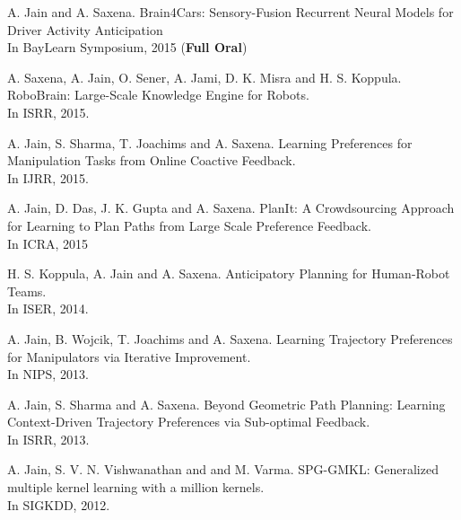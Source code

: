 \documentclass[line,margin]{res}
\begin{document}
\begin{resume}
		A. Jain and A. Saxena. Brain4Cars: Sensory-Fusion Recurrent Neural Models for Driver Activity Anticipation\\
In BayLearn Symposium, 2015 (\textbf{Full Oral}) 
 
  		A. Saxena, A. Jain, O. Sener, A. Jami, D. K. Misra and H. S. Koppula.
RoboBrain: Large-Scale Knowledge Engine for Robots.\\In ISRR, 2015.

  		A. Jain, S. Sharma, T. Joachims and  A. Saxena. Learning Preferences for
Manipulation Tasks from Online Coactive Feedback.\\In IJRR, 2015.
 
 		A. Jain, D. Das, J. K. Gupta and  A. Saxena. PlanIt: A Crowdsourcing
Approach for Learning to Plan Paths from Large Scale Preference Feedback.\\In ICRA, 2015
 
 		H. S. Koppula, A. Jain and A. Saxena. Anticipatory Planning for
Human-Robot Teams.\\In ISER, 2014.
 
		 A. Jain, B. Wojcik, T. Joachims and A. Saxena. Learning Trajectory Preferences for Manipulators via Iterative Improvement.\\In NIPS, 2013.

 		A. Jain, S. Sharma  and A. Saxena. Beyond Geometric Path Planning:
Learning Context-Driven Trajectory Preferences via Sub-optimal Feedback.\\In ISRR, 2013.

  		A. Jain, S. V. N. Vishwanathan and and M. Varma. SPG-GMKL:
Generalized multiple kernel learning with a million kernels.\\In  SIGKDD, 2012.


\end{resume}
\end{document}
